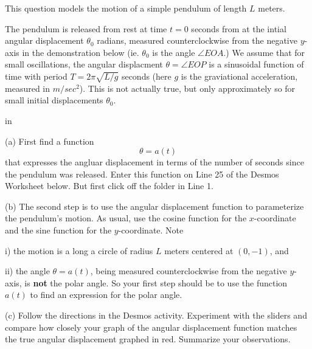 \documentclass{ximera}
\newcommand{\pskip}{\vskip 0.1 in}
\begin{document}
\begin{question}   \label{Q30:InverseTrig}
This question models the motion of a simple pendulum of length $L$ meters. 

The pendulum is released from rest at time $t=0$ seconds from at the intial angular displacement $\theta_0$ radians, measured counterclockwise from the negative $y$-axis in the demonstration below (ie. $\theta_0$ is the angle $\angle EOA$.)  We assume that for small oscillations, the angular displacment $\theta = \angle EOP$ is a sinusoidal function of time with period $T=2\pi \sqrt{L/g}$ seconds (here $g$ is the graviational acceleration, measured in $m/sec^2$). This is not actually true, but only approximately so for small initial displacements $\theta_0$. 

\pskip

(a) First find a function 
\[
   \theta = a(t) 
\]
that expresses the angluar displacement in terms of the number of seconds since the pendulum was released. Enter this function on Line 25 of the Desmos Worksheet below. But first click off the folder in Line 1.

(b) The second step is to use the angular displacement function to parameterize the pendulum's motion. As usual, use the cosine function for the $x$-coordinate and the sine function for the $y$-coordinate. Note 

i) the motion is a long a circle of radius $L$ meters centered at $(0,-1)$, and

ii) the angle $\theta = a(t)$, being measured counterclockwise from the negative $y$-axis,  is {\bf not} the polar angle. So your first step should be to use the function $a(t)$ to find an expression for the polar angle.

(c) Follow the directions in the Desmos activity. Experiment with the sliders and compare how closely your graph of the angular displacement function matches the true angular displacement graphed in red. Summarize your observations.


\begin{exploration}\label{Exp3:Comp}

 
\begin{onlineOnly}
    \begin{center}
\end{center}
\end{onlineOnly}
\end{exploration}


\end{question}
\end{document}
